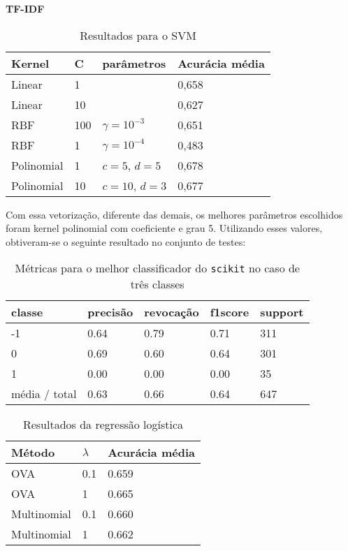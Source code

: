 \textbf{TF-IDF}

\begin{table}[H]
	\centering
	\caption{Resultados para o SVM}
	\begin{tabular}{l l l l}
		\hline
		Kernel & C & parâmetros & Acurácia média \\
		\hline
		Linear & 1 & & 0,658 \\
		\hline
		Linear & 10 & & 0,627 \\
		\hline
		RBF & 100 & $\gamma = 10^{-3}$ & 0,651 \\
		\hline
		RBF & 1 & $\gamma = 10^{-4}$ & 0,483 \\
		\hline
		Polinomial & 1 & $c = 5$, $d = 5$ & 0,678 \\
		\hline
		Polinomial & 10 & $c = 10$, $d = 3$ & 0,677 \\
		\hline
	\end{tabular}
\end{table}

Com essa vetorização, diferente das demais, os melhores parâmetros escolhidos foram kernel polinomial
com coeficiente e grau 5. Utilizando esses valores, obtiveram-se o seguinte resultado no conjunto de
testes:

\begin{table}[H]
	\centering
		\begin{tabular}{l | l | l | l | l}
		\hline
		classe  	&	precisão  &  revocação &  f1\-score &  support \\
		\hline
		 -1    &   0.64   &   0.79   &   0.71   &    311 \\
		 \hline
          0    &   0.69   &   0.60  &    0.64    &   301 \\
          \hline
          1   &    0.00   &   0.00   &   0.00    &    35 \\
          \hline
		média / total   &    0.63   &   0.66   &   0.64   &    647 \\
		\hline
	\end{tabular}
	\caption{Métricas para o melhor classificador do \texttt{scikit} no caso de três classes}
	\label{tab:best_scikit}
\end{table}

\begin{table}[H]
	\centering
	\caption{Resultados da regressão logística}
	\begin{tabular}{l l l}
		\hline
		Método & $\lambda$ & Acurácia média \\
		\hline
		OVA & 0.1 & 0.659 \\
		\hline
		OVA & 1 & 0.665 \\
		\hline
		Multinomial & 0.1 & 0.660 \\
		\hline
		Multinomial & 1 & 0.662 \\
		\hline
	\end{tabular}
\end{table}

